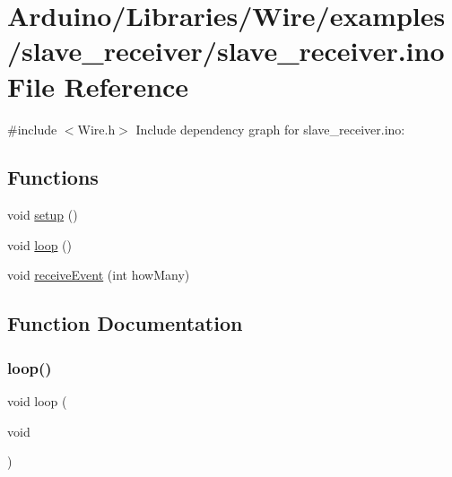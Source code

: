 \hypertarget{slave__receiver_8ino}{}\section{Arduino/\+Libraries/\+Wire/examples/slave\+\_\+receiver/slave\+\_\+receiver.ino File Reference}
\label{slave__receiver_8ino}
{\ttfamily \#include $<$Wire.\+h$>$}\newline
Include dependency graph for slave\+\_\+receiver.\+ino\+:
\subsection*{Functions}
\begin{DoxyCompactItemize}
\item 
void \hyperlink{slave__receiver_8ino_a4fc01d736fe50cf5b977f755b675f11d}{setup} ()
\item 
void \hyperlink{slave__receiver_8ino_afe461d27b9c48d5921c00d521181f12f}{loop} ()
\item 
void \hyperlink{slave__receiver_8ino_a9a52aa0319b0d3bea95eff4528baee98}{receive\+Event} (int how\+Many)
\end{DoxyCompactItemize}


\subsection{Function Documentation}
\mbox{\label{slave__receiver_8ino_afe461d27b9c48d5921c00d521181f12f}} 
\subsubsection{\texorpdfstring{loop()}{loop()}}
{\footnotesize\ttfamily void loop (\begin{DoxyParamCaption}\item[{void}]{ }\end{DoxyParamCaption})}

\mbox{\label{slave__receiver_8ino_a9a52aa0319b0d3bea95eff4528baee98}} 
